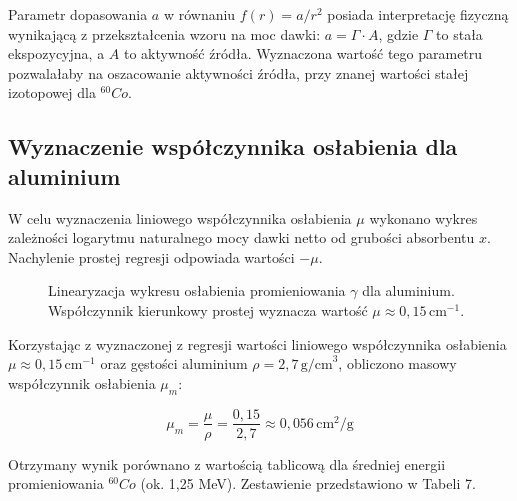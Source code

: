 \documentclass{article}
\begin{document}
Parametr dopasowania $a$ w równaniu $f(r) = a/r^2$ posiada interpretację fizyczną wynikającą z przekształcenia wzoru na moc dawki: $a = \Gamma \cdot A$, gdzie $\Gamma$ to stała ekspozycyjna, a $A$ to aktywność źródła. Wyznaczona wartość tego parametru pozwalałaby na oszacowanie aktywności źródła, przy znanej wartości stałej izotopowej dla $^{60}Co$.


\subsection{Wyznaczenie współczynnika osłabienia dla aluminium}



W celu wyznaczenia liniowego współczynnika osłabienia $\mu$ wykonano wykres zależności logarytmu naturalnego mocy dawki netto od grubości absorbentu $x$. Nachylenie prostej regresji odpowiada wartości $-\mu$.

\begin{figure}[H]
\centering
{}
\caption{Linearyzacja wykresu osłabienia promieniowania $\gamma$ dla aluminium. Współczynnik kierunkowy prostej wyznacza wartość $\mu \approx 0,15 \, \text{cm}^{-1}$.}
\end{figure}

Korzystając z wyznaczonej z regresji wartości liniowego współczynnika osłabienia $\mu \approx 0,15 \, \text{cm}^{-1}$ oraz gęstości aluminium $\rho = 2,7 \, \text{g/cm}^3$, obliczono masowy współczynnik osłabienia $\mu_m$:

\begin{equation}
\mu_m = \frac{\mu}{\rho} = \frac{0,15}{2,7} \approx 0,056 \, \text{cm}^2/\text{g}
\end{equation}

Otrzymany wynik porównano z wartością tablicową dla średniej energii promieniowania $^{60}Co$ (ok. 1,25 MeV). Zestawienie przedstawiono w Tabeli 7.
\end{document}
